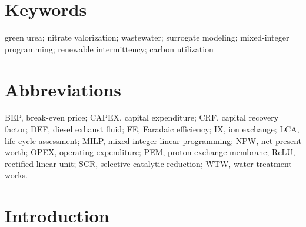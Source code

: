 \documentclass[letterpaper]{article}
\begin{document}
\begin{abstract}
\pounds$404~\mathrm{kg^{-1}}$, against a market price of
\pounds$1.83~\mathrm{kg^{-1}}$, shows that economic viability is
limited by plant scale rather than by renewable intermittency. Within
the gate-to-gate boundary, with the dedicated wind supply
carbon-neutral at the point of use, the process is a net consumer of
 at $-0.73~\mathrm{kg_{CO_2}\,kg^{-1}}$ in every case;
including life-cycle electricity intensities as a sensitivity yields
$+1.6~\mathrm{kg_{CO_2}\,kg^{-1}}$, comparable to conventional
production, which identifies the specific electricity demand as the
key maturation lever. These results indicate that nitrate-to-urea
valorization is technically feasible and compatible with fully
islanded wind operation, but that its economics call for feedstock
aggregation toward larger scales or remuneration of the
nitrate-removal service itself, rather than support directed at the
renewable-energy supply.
\end{abstract}

\section*{Keywords}

green urea; nitrate valorization; wastewater; surrogate modeling;
mixed-integer programming; renewable intermittency; carbon utilization

\section*{Abbreviations}

BEP, break-even price; CAPEX, capital expenditure; CRF, capital
recovery factor; DEF, diesel exhaust fluid; FE, Faradaic efficiency;
IX, ion exchange; LCA, life-cycle assessment; MILP, mixed-integer
linear programming; NPW, net present worth; OPEX, operating
expenditure; PEM, proton-exchange membrane; ReLU, rectified linear
unit; SCR, selective catalytic reduction; WTW, water treatment works.

\section{Introduction}
\end{document}
